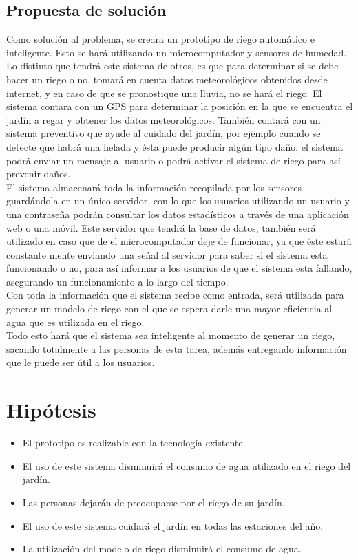 \documentclass[11pt,letterpaper]{article}
\begin{document}
\newpage

\subsection{Propuesta de solución}
Como solución al problema, se creara un prototipo de riego automático e inteligente. Esto se hará utilizando un microcomputador y sensores de humedad. Lo distinto que tendrá este sistema de otros, es que para determinar si se debe hacer un riego o no, tomará en cuenta datos meteorológicos obtenidos desde internet, y en caso de que se pronostique una lluvia, no se hará el riego. El sistema contara con un GPS para determinar la posición en la que se encuentra el jardín a regar y obtener los datos meteorológicos. También contará con un sistema preventivo que ayude al cuidado del jardín, por ejemplo cuando se detecte que habrá una helada y ésta puede producir algún tipo daño, el sistema podrá enviar un mensaje al usuario o podrá activar el sistema de riego para así prevenir daños.\\
El sistema almacenará toda la información recopilada por los sensores guardándola en un único servidor, con lo que los usuarios utilizando un usuario y una contraseña podrán consultar los datos estadísticos a través de una aplicación web o una móvil. Este servidor que tendrá la base de datos, también será utilizado en caso que de el microcomputador deje de funcionar, ya que éste estará constante mente enviando una señal al servidor para saber si el sistema esta funcionando o no, para así informar a los usuarios de que el sistema esta fallando, asegurando un funcionamiento a lo largo del tiempo.\\
Con toda la información que el sistema recibe como entrada, será utilizada para generar un modelo de riego con el que se espera darle una mayor eficiencia al agua que es utilizada en el riego.\\
Todo esto hará que el sistema sea inteligente al momento de generar un riego, sacando totalmente a las personas de esta tarea, además entregando información que le puede ser útil a los usuarios.

\newpage

\section{Hipótesis}
\begin{itemize}
\item El prototipo es realizable con la tecnología existente.
\item El uso de este sistema disminuirá el consumo de agua utilizado en el riego del jardín.
\item Las personas dejarán de preocuparse por el riego de su jardín.
\item El uso de este sistema cuidará el jardín en todas las estaciones del año.
\item La utilización del modelo de riego disminuirá el consumo de agua.
\end{itemize}
\end{document}
